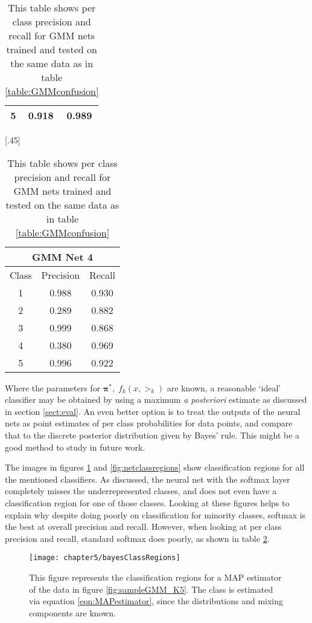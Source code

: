 \begin{table}[ht]
{\begin{tabular}{|c|c|c|}
			5          & 0.918          & 0.989      \\ \hline
		\end{tabular}
	}
	[.45\linewidth]{
		\begin{tabular}{|c|c|c|}
			\hline
			\multicolumn{3}{|c|}{\textbf{GMM Net 4}} \\ \hline
			Class      & Precision      & Recall     \\ \hline
			1          & 0.988          & 0.930      \\ \hline
			2          & 0.289          & 0.882      \\ \hline
			3          & 0.999          & 0.868      \\ \hline
			4          & 0.380          & 0.969      \\ \hline
			5          & 0.996          & 0.922      \\ \hline
		\end{tabular}
	}
	\caption[Per class precision and recall for GMM nets \#1-\#4]{This table shows per class precision and recall for GMM nets trained and tested on the same data as in table \ref{table:GMMconfusion}}\label{table:GMMprecRec}
\end{table}

Where the parameters for \( \bm\pi^{\ast}\!,\; f_k(x,\bm\gt_k) \) are known, a reasonable `ideal' classifier may be obtained by using a maximum \textit{a posteriori} estimate as discussed in section \ref{sect:eval}.  An even better option is to treat the outputs of the neural nets as point estimates of per class probabilities for data points, and compare that to the discrete posterior distribution given by Bayes' rule. This might be a good method to study in future work.

The images in figures \ref{fig:bayesclassregions} and \ref{fig:netclassregions} show classification regions for all the mentioned classifiers. As discussed, the neural net with the softmax layer completely misses the underrepresented classes, and does not even have a classification region for one of those classes. Looking at these figures helps to explain why despite doing poorly on classification for minority classes, softmax is the best at overall precision and recall. However, when looking at per class precision and recall, standard softmax does poorly, as shown in table \ref{table:GMMprecRec}.


\begin{figure}[ht]
	\centering
	\texttt{[image: chapter5/bayesClassRegions]}
	\caption[Classification Regions for the MAP classifier 1]{This figure represents the classification regions for a MAP estimator of the data in figure \ref{fig:sampleGMM_K5}. The class is estimated via equation \eqref{eqn:MAPestimator}, since the distributions and mixing components are known. }
	\label{fig:bayesclassregions}
\end{figure}

